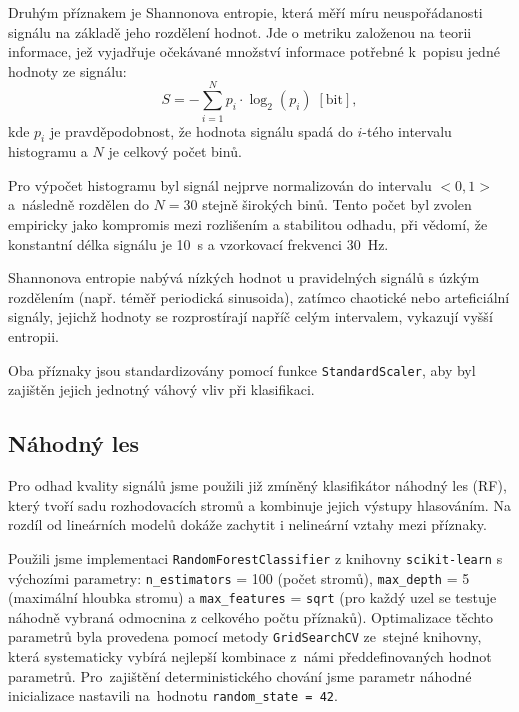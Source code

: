 Druhým příznakem je Shannonova entropie, která měří míru neuspořádanosti signálu na základě jeho rozdělení hodnot.
Jde o metriku založenou na teorii informace, jež vyjadřuje očekávané množství informace potřebné k~popisu jedné hodnoty ze signálu:
\begin{equation}
	\label{eq:shannon_entropy}
	S = - \sum_{i=1}^{N} p_i \cdot \log_2(p_i) \; [\text{bit}],
\end{equation}
kde $p_i$ je pravděpodobnost, že hodnota signálu spadá do $i$-tého intervalu histogramu a $N$ je celkový počet binů.

Pro výpočet histogramu byl signál nejprve normalizován do intervalu $< 0, 1 >$ a~následně rozdělen do $N = 30$ stejně širokých binů.
Tento počet byl zvolen empiricky jako kompromis mezi rozlišením a stabilitou odhadu, při vědomí, že konstantní délka signálu je 10~s a vzorkovací frekvenci 30~Hz.

Shannonova entropie nabývá nízkých hodnot u pravidelných signálů s úzkým rozdělením (např. téměř periodická sinusoida),
zatímco chaotické nebo arteficiální signály, jejichž hodnoty se rozprostírají napříč celým intervalem, vykazují vyšší entropii.

Oba příznaky jsou standardizovány pomocí funkce \texttt{StandardScaler}, aby byl zajištěn jejich jednotný váhový vliv při klasifikaci.

\subsection*{Náhodný les}
\label{subsec:random_forest}
Pro odhad kvality signálů jsme použili již zmíněný klasifikátor náhodný les (\acs{RF}), který tvoří sadu rozhodovacích stromů a kombinuje jejich výstupy hlasováním.
Na rozdíl od lineárních modelů dokáže zachytit i nelineární vztahy mezi příznaky.

Použili jsme implementaci \texttt{RandomForestClassifier} z knihovny \texttt{scikit-learn} s výchozími parametry: \texttt{n\_estimators} = 100 (počet stromů), \texttt{max\_depth} = 5 (maximální hloubka stromu) a \texttt{max\_features} = \texttt{sqrt} (pro každý uzel se testuje náhodně vybraná odmocnina z celkového počtu příznaků).
Optimalizace těchto parametrů byla provedena pomocí metody \texttt{GridSearchCV} ze~stejné knihovny, která systematicky vybírá nejlepší kombinace z~námi předdefinovaných hodnot parametrů.
Pro~zajištění deterministického chování jsme parametr náhodné inicializace nastavili na~hodnotu \texttt{random\_state = 42}.

